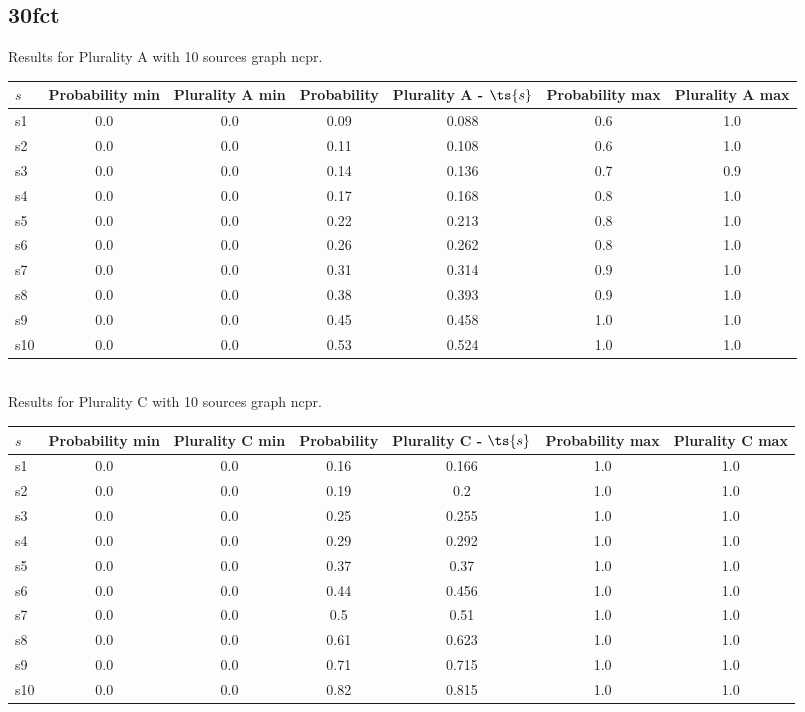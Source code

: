 \documentclass{article}
\begin{document}
\newpage

\subsection{30fct}

\noindent Results for Plurality A with 10 sources graph ncpr.

\noindent\begin{tabular}{|l|c|c|c|c|c|c|}
\hline
$s$& Probability min & Plurality A min & Probability & Plurality A - $\ts{s}$ & Probability max & Plurality A max\\
\hline
s1 &0.0 & 0.0 & 0.09 & 0.088 & 0.6 & 1.0\\
\hline
s2 &0.0 & 0.0 & 0.11 & 0.108 & 0.6 & 1.0\\
\hline
s3 &0.0 & 0.0 & 0.14 & 0.136 & 0.7 & 0.9\\
\hline
s4 &0.0 & 0.0 & 0.17 & 0.168 & 0.8 & 1.0\\
\hline
s5 &0.0 & 0.0 & 0.22 & 0.213 & 0.8 & 1.0\\
\hline
s6 &0.0 & 0.0 & 0.26 & 0.262 & 0.8 & 1.0\\
\hline
s7 &0.0 & 0.0 & 0.31 & 0.314 & 0.9 & 1.0\\
\hline
s8 &0.0 & 0.0 & 0.38 & 0.393 & 0.9 & 1.0\\
\hline
s9 &0.0 & 0.0 & 0.45 & 0.458 & 1.0 & 1.0\\
\hline
s10 &0.0 & 0.0 & 0.53 & 0.524 & 1.0 & 1.0\\
\hline
\end{tabular}\\

\noindent Results for Plurality C with 10 sources graph ncpr.

\noindent\begin{tabular}{|l|c|c|c|c|c|c|}
\hline
$s$& Probability min & Plurality C min & Probability & Plurality C - $\ts{s}$ & Probability max & Plurality C max\\
\hline
s1 &0.0 & 0.0 & 0.16 & 0.166 & 1.0 & 1.0\\
\hline
s2 &0.0 & 0.0 & 0.19 & 0.2 & 1.0 & 1.0\\
\hline
s3 &0.0 & 0.0 & 0.25 & 0.255 & 1.0 & 1.0\\
\hline
s4 &0.0 & 0.0 & 0.29 & 0.292 & 1.0 & 1.0\\
\hline
s5 &0.0 & 0.0 & 0.37 & 0.37 & 1.0 & 1.0\\
\hline
s6 &0.0 & 0.0 & 0.44 & 0.456 & 1.0 & 1.0\\
\hline
s7 &0.0 & 0.0 & 0.5 & 0.51 & 1.0 & 1.0\\
\hline
s8 &0.0 & 0.0 & 0.61 & 0.623 & 1.0 & 1.0\\
\hline
s9 &0.0 & 0.0 & 0.71 & 0.715 & 1.0 & 1.0\\
\hline
s10 &0.0 & 0.0 & 0.82 & 0.815 & 1.0 & 1.0\\
\hline
\end{tabular}\\
\end{document}
